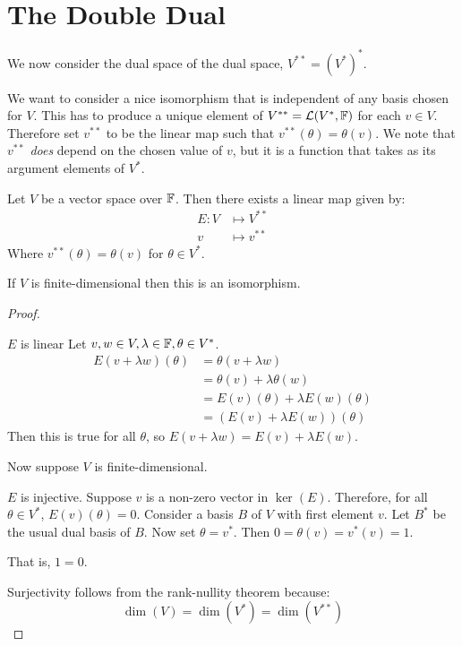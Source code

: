 \documentclass[../Main.tex]{subfiles}
\begin{document}
\section{The Double Dual}
We now consider the dual space of the dual space, $V^{**} = (V^*)^*$.

We want to consider a nice isomorphism that is independent of any basis chosen for $V$. This has to produce a unique element of $V^{**} = \mathcal{L}(V^*, \mathbb{F})$ for each $v \in V$. Therefore set $v^{**}$ to be the linear map such that $v^{**}(\theta) = \theta(v)$. We note that $v^{**}$ \textit{does} depend on the chosen value of $v$, but it is a function that takes as its argument elements of $V^*$.
\begin{theorem}
    Let $V$ be a vector space over $\mathbb{F}$. Then there exists a linear map given by:
    \begin{align*}
        E : V &\mapsto V^{**}\\
        v &\mapsto v^{**}
    \end{align*}
    Where $v^{**}(\theta) = \theta(v)$ for $\theta \in V^*$.
    
    If $V$ is finite-dimensional then this is an isomorphism.
    \label{thmNatIsom}
\end{theorem}
\begin{proof}
    \begin{subproof}{$E$ is linear}
        Let $v, w \in V, \lambda \in \mathbb{F}, \theta \in V^*$.
        \begin{align*}
            E(v + \lambda w)(\theta) &= \theta(v + \lambda w) \\
            &= \theta(v) + \lambda \theta(w) \\
            &= E (v)(\theta) + \lambda E(w)(\theta) \\
            &= \left(E(v) + \lambda E(w)\right)(\theta)
        \end{align*}
        Then this is true for all $\theta$, so $E(v + \lambda w) = E(v) + \lambda E(w)$.
    \end{subproof}
    Now suppose $V$ is finite-dimensional.
    \begin{subproof}{$E$ is injective.}
        Suppose $v$ is a non-zero vector in $\ker(E)$. Therefore, for all $\theta \in V^*$, $E(v)(\theta) = 0$. Consider a basis $B$ of $V$ with first element $v$. Let $B^*$ be the usual dual basis of $B$. Now set $\theta = v^*$. Then $0 = \theta(v) = v^*(v) = 1$.

        That is, $1 = 0$. \contradiction
    \end{subproof}
    Surjectivity follows from the rank-nullity theorem because:
    \begin{equation*}
        \dim(V) = \dim(V^*) = \dim(V^{**})
    \end{equation*}
\end{proof}
\end{document}
